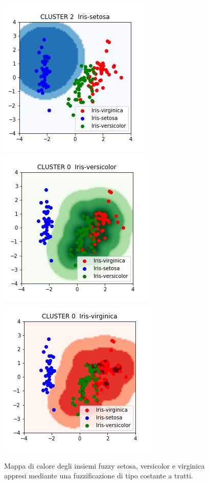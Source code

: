 \documentclass [11pt,a4paper,twoside,openright] {book}
\begin{document}
\begin{figure}[!tb]
        \centering%
        \subfigure%
          {\includegraphics[scale=.3]{figure/qc1.png}}\qquad\qquad
       \subfigure%
          {\includegraphics[scale=.3]{figure/qc2.png}}\qquad\qquad
           \subfigure%
          {\includegraphics[scale=.3]{figure/qc3.png}}
          \caption{Mappa di calore degli insiemi fuzzy  setosa, versicolor e virginica appresi mediante una fuzzificazione di tipo costante a tratti\label{qc}.}
\end{figure}
\end{document}

